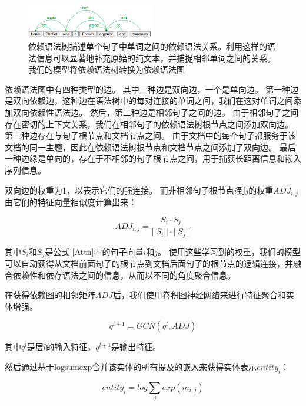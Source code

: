 \documentclass[bachelor]{thesis-uestc}
\begin{document}
\begin{figure}[t]
    \includegraphics[width=0.5\textwidth]{misc/dependency.png}
    \caption{依赖语法树描述单个句子中单词之间的依赖语法关系。利用这样的语法信息可以显著地补充原始的纯文本，并捕捉相邻单词之间的关系。我们的模型将依赖语法树转换为依赖语法图} 
    \label{fig_syn_a}
\end{figure}

依赖语法图中有四种类型的边。
其中三种边是双向边，一个是单向边。
第一种边是双向依赖边，这种边在语法树中的每对连接的单词之间，我们在这对单词之间添加双向依赖性语法边。
然后，第二种边是相邻句子之间的边。
由于相邻句子之间存在密切的上下文关系，我们在相邻句子的依赖语法树根节点之间添加双向边。
第三种边存在与句子根节点和文档节点之间。
由于文档中的每个句子都服务于该文档的同一主题，因此在依赖语法树根节点和文档节点之间添加了双向边。
最后一种边缘是单向的，存在于不相邻的句子根节点之间，用于捕获长距离信息和嵌入序列信息。\par
双向边的权重为1，以表示它们的强连接。
而非相邻句子根节点$i$到$j$的权重$ADJ_{i, j}$由它们的特征向量相似度计算出来：

\begin{equation}
    \label{edge weight}
    ADJ_{i,j} = \frac{S_i \cdot S_j}{||S_i|| \cdot ||S_j||}
\end{equation}

其中$S_i$和$S_j$是公式 \ref{Attn}中的句子向量$i$和$j$。
使用这些学习到的权重，我们的模型可以自动获得从文档前面句子的根节点到文档后面句子的根节点的逻辑连接，并融合依赖性和依存语法之间的信息，从而以不同的角度聚合信息。
\par

在获得依赖图的相邻矩阵$ADJ$后，我们使用卷积图神经网络来进行特征聚合和实体增强。

\begin{equation}
    q^{l+1} = GCN(q^{l}, ADJ)
\end{equation}

其中$q^l$是层$l$的输入特征，$q^{l+1}$是输出特征。\par
然后通过基于logsumexp合并该实体的所有提及的嵌入来获得实体表示$entity_i$：

\begin{equation}
    \label{logsumexp}
    entity_i =  log \sum_{j} exp(m_{i,j})
\end{equation}
\end{document}
